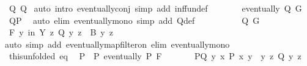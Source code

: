 \begin{isabellebody}
\ Q{\isacharprime}{\kern0pt}{\isacharprime}{\kern0pt}\ Q{\isacharprime}{\kern0pt}\ \isamarkupfalse%
{\isacharparenleft}{\kern0pt}auto\ intro{\isacharcolon}{\kern0pt}\ eventually{\isacharunderscore}{\kern0pt}conj\ simp\ add{\isacharcolon}{\kern0pt}\ inf{\isacharunderscore}{\kern0pt}fun{\isacharunderscore}{\kern0pt}def{\isacharparenright}{\kern0pt}\isanewline
\ \ \ \ \isamarkupfalse%
\ \isamarkupfalse%
\ {\isachardoublequoteopen}eventually\ Q{\isacharprime}{\kern0pt}\ G{\isachardoublequoteclose}\ \isamarkupfalse%
\ Q{\isacharprime}{\kern0pt}{\isacharprime}{\kern0pt}P\ \ \isamarkupfalse%
{\isacharparenleft}{\kern0pt}auto\ elim{\isacharbang}{\kern0pt}{\isacharcolon}{\kern0pt}\ eventually{\isacharunderscore}{\kern0pt}mono\ simp\ add{\isacharcolon}{\kern0pt}\ Q{\isacharprime}{\kern0pt}{\isacharunderscore}{\kern0pt}def{\isacharparenright}{\kern0pt}\isanewline
\ \ \ \ \isamarkupfalse%
\isanewline
\ \ \ \ \isamarkupfalse%
\ Q{\isacharprime}{\kern0pt}\ G\ \isamarkupfalse%
\ {\isachardoublequoteopen}{\isasymforall}\isactrlsub F\ y\ in\ {\isacharquery}{\kern0pt}Y{}{\isachardot}{\kern0pt}\ {\isasymexists}z{\isachardot}{\kern0pt}\ Q\ {\isacharparenleft}{\kern0pt}y{\isacharcomma}{\kern0pt}\ z{\isacharparenright}{\kern0pt}\ {\isasymand}\ B\ y\ z{\isachardoublequoteclose}\isanewline
\ \ \ \ \ \ \isamarkupfalse%
{\isacharparenleft}{\kern0pt}auto\ simp\ add{\isacharcolon}{\kern0pt}\ eventually{\isacharunderscore}{\kern0pt}map{\isacharunderscore}{\kern0pt}filter{\isacharunderscore}{\kern0pt}on\ elim{\isacharbang}{\kern0pt}{\isacharcolon}{\kern0pt}\ eventually{\isacharunderscore}{\kern0pt}mono{\isacharparenright}{\kern0pt}\isanewline
\ \ \ \ \isamarkupfalse%
\ this{\isacharbrackleft}{\kern0pt}unfolded\ eq{\isacharbrackright}{\kern0pt}\ \isamarkupfalse%
\ P{\isacharprime}{\kern0pt}{\isacharprime}{\kern0pt}\ \ P{\isacharprime}{\kern0pt}{\isacharprime}{\kern0pt}{\isacharcolon}{\kern0pt}\ {\isachardoublequoteopen}eventually\ P{\isacharprime}{\kern0pt}{\isacharprime}{\kern0pt}\ F{\isachardoublequoteclose}\isanewline
\ \ \ \ \ \ \ P{\isacharprime}{\kern0pt}{\isacharprime}{\kern0pt}Q{\isacharcolon}{\kern0pt}\ {\isachardoublequoteopen}{\isacharbraceleft}{\kern0pt}y{\isachardot}{\kern0pt}\ {\isasymexists}x{\isachardot}{\kern0pt}\ P{\isacharprime}{\kern0pt}{\isacharprime}{\kern0pt}\ {\isacharparenleft}{\kern0pt}x{\isacharcomma}{\kern0pt}\ y{\isacharparenright}{\kern0pt}{\isacharbraceright}{\kern0pt}\ {\isasymsubseteq}\ {\isacharbraceleft}{\kern0pt}y{\isachardot}{\kern0pt}\ {\isasymexists}z{\isachardot}{\kern0pt}\ {\isacharquery}{\kern0pt}Q\ {\isacharparenleft}{\kern0pt}y{\isacharcomma}{\kern0pt}\ z{\isacharparenright}{\kern0pt}{\isacharbraceright}{\kern0pt}{\isachardoublequoteclose}\isanewline

\end{isabellebody}
